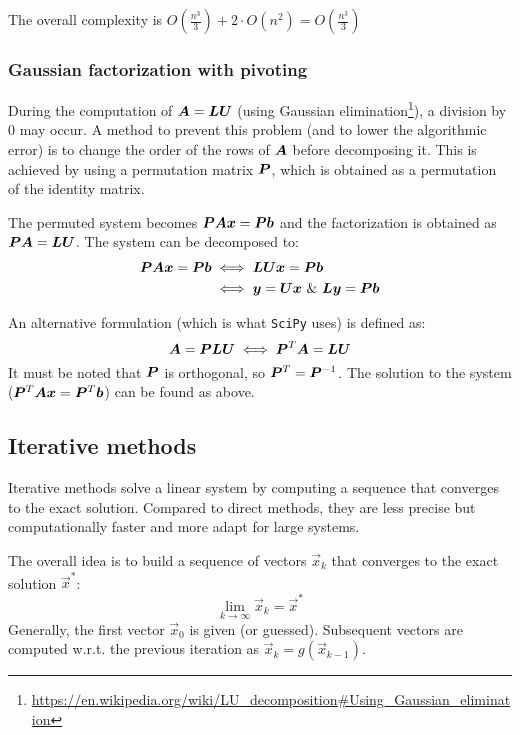 The overall complexity is $O(\frac{n^3}{3}) + 2 \cdot O(n^2) = O(\frac{n^3}{3})$

\subsubsection{Gaussian factorization with pivoting}
During the computation of ${\bm{A}} = {\bm{L}}{\bm{U}}$ 
(using Gaussian elimination\footnote{\url{https://en.wikipedia.org/wiki/LU\_decomposition\#Using\_Gaussian\_elimination}}), 
a division by 0 may occur.
A method to prevent this problem (and to lower the algorithmic error) is to change the order of the rows of ${\bm{A}}$ before decomposing it.
This is achieved by using a permutation matrix ${\bm{P}}$, which is obtained as a permutation of the identity matrix.

The permuted system becomes ${\bm{P}}{\bm{A}}{\bm{x}} = {\bm{P}}{\bm{b}}$ and the factorization is obtained as ${\bm{P}}{\bm{A}} = {\bm{L}}{\bm{U}}$.
The system can be decomposed to:
\begin{equation}
    \begin{split}
        {\bm{P}}{\bm{A}}{\bm{x}} = {\bm{P}}{\bm{b}} & \iff {\bm{L}}{\bm{U}}{\bm{x}} = {\bm{P}}{\bm{b}} \\
            & \iff {\bm{y}} = {\bm{U}}{\bm{x}} \text{ \& } {\bm{L}}{\bm{y}} = {\bm{P}}{\bm{b}}
    \end{split}
\end{equation}

An alternative formulation (which is what \texttt{SciPy} uses) 
is defined as:
\[{\bm{A}} = {\bm{P}}{\bm{L}}{\bm{U}} \iff {\bm{P}}^T{\bm{A}} = {\bm{L}}{\bm{U}} \]
It must be noted that ${\bm{P}}$ is orthogonal, so ${\bm{P}}^T = {\bm{P}}^{-1}$.
The solution to the system (${\bm{P}}^T{\bm{A}}{\bm{x}} = {\bm{P}}^T{\bm{b}}$) can be found as above.



\subsection{Iterative methods}
Iterative methods solve a linear system by computing a sequence that converges to the exact solution.
Compared to direct methods, they are less precise but computationally faster and more adapt for large systems. 

The overall idea is to build a sequence of vectors $\vec{x}_k$ 
that converges to the exact solution $\vec{x}^*$:
\[ \lim_{k \rightarrow \infty} \vec{x}_k = \vec{x}^* \]
Generally, the first vector $\vec{x}_0$ is given (or guessed). Subsequent vectors are computed w.r.t. the previous iteration 
as $\vec{x}_k = g(\vec{x}_{k-1})$.

